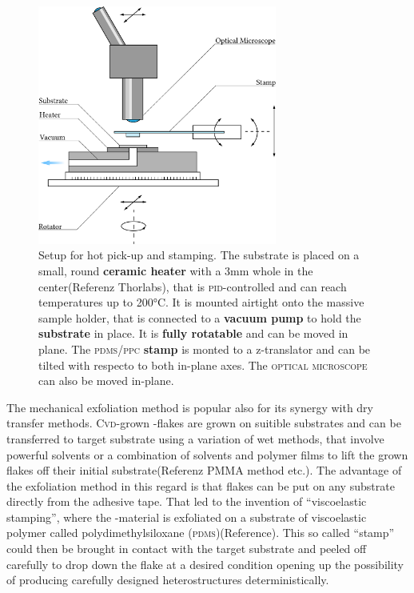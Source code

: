 \begin{figure}
	\centering
	\includegraphics[width=0.7\textwidth]{Stempelaufbau.png}

	\caption{Setup for hot pick-up and stamping. The substrate is placed on a small, round \textbf{ceramic heater} with a 3mm whole in the center(Referenz Thorlabs), that is \textsc{pid}-controlled and can reach temperatures up to 200°C. It is mounted airtight onto the massive sample holder, that is connected to a \textbf{vacuum pump} to hold the \textbf{substrate} in place. It is \textbf{fully rotatable} and can be moved in plane. The \textsc{pdms/ppc} \textbf{stamp} is monted to a z-translator and can be tilted with respecto to both in-plane axes. The \textsc{optical microscope} can also be moved in-plane.}
	\label{stamping-setup}
\end{figure}

The mechanical exfoliation method is popular also for its synergy with dry transfer methods. \textsc{Cvd}-grown \tmd-flakes are grown on suitible substrates and can be transferred to target substrate using a variation of wet methods, that involve powerful solvents or a combination of solvents and polymer films to lift the grown flakes off their initial substrate(Referenz PMMA method etc.). The advantage of the exfoliation method in this regard is that flakes can be put on any substrate directly from the adhesive tape. That led to the invention of ``viscoelastic stamping'', where the \tmd-material is exfoliated on a substrate of viscoelastic polymer called polydimethylsiloxane (\textsc{pdms})(Reference). This so called ``stamp'' could then be brought in contact with the target substrate and peeled off carefully to drop down the flake at a desired condition opening up the possibility of producing carefully designed heterostructures deterministically.

